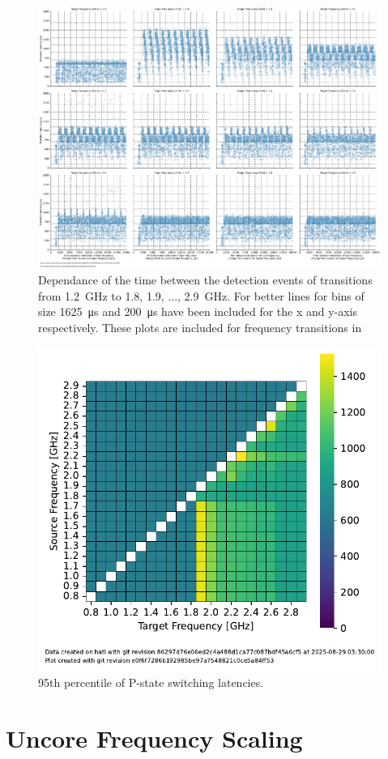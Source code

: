\begin{figure}[]
    \centering
    \includegraphics[width=\columnwidth]{fig/ftalat/ftalat_scatter_wait_transition_latency_hati.pdf}
    \caption{\label{fig:pstate_latencies_time_dependance}Dependance of the time between the detection events of transitions from \SI{1.2}{\GHz} to \SI{1.8}{}, \SI{1.9}{}, ..., \SI{2.9}{\GHz}. For better lines for bins of size \SI{1625}{\us} and \SI{200}{\us} have been included for the x and y-axis respectively. These plots are included for frequency transitions in~}
\end{figure}

\begin{figure}[]
    \centering
    \includegraphics[width=0.45\columnwidth]{fig/ftalat/ftalat_95percentQuantile_hati.pdf}
    \caption{\label{fig:pstate_latencies_95percentQuantile}95th percentile of P-state switching latencies.}
\end{figure}


\section{Uncore Frequency Scaling}


